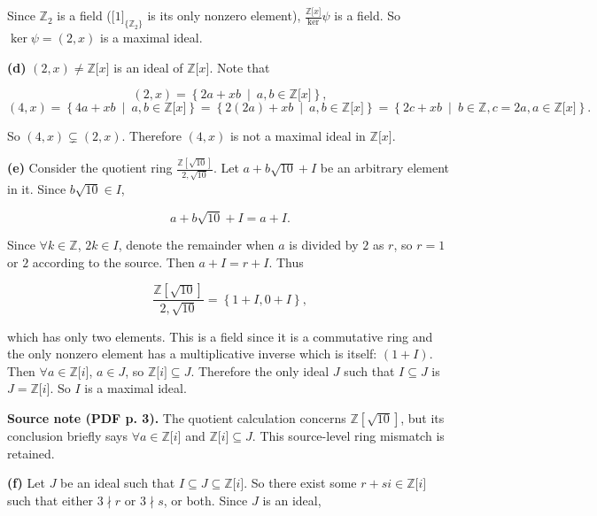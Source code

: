 Since \(\mathbb{Z}_{2}\) is a field (\(\lbrack 1\rbrack_{\{\mathbb{Z}_{2}\}}\) is its only nonzero element), \(\frac{\mathbb{Z}\lbrack x\rbrack}{\ker}\psi\) is a field. So \(\ker\psi = \left( {2,x} \right)\) is a maximal ideal.

\textbf{(d)} \(\left( {2,x} \right) \neq \mathbb{Z}\lbrack x\rbrack\) is an ideal of \(\mathbb{Z}\lbrack x\rbrack\). Note that

\[\left( {2,x} \right) = \left\{ 2a + xb\  \middle| \ a,b \in \mathbb{Z}\lbrack x\rbrack \right\},\]\[\left( {4,x} \right) = \left\{ 4a + xb\  \middle| \ a,b \in \mathbb{Z}\lbrack x\rbrack \right\} = \left\{ 2\left( {2a} \right) + xb\  \middle| \ a,b \in \mathbb{Z}\lbrack x\rbrack \right\} = \left\{ 2c + xb\  \middle| \ b \in \mathbb{Z},c = 2a,a \in \mathbb{Z}\lbrack x\rbrack \right\}.\]

So \(\left( {4,x} \right) \subsetneq \left( {2,x} \right)\). Therefore \(\left( {4,x} \right)\) is not a maximal ideal in \(\mathbb{Z}\lbrack x\rbrack\).

\textbf{(e)} Consider the quotient ring \(\frac{\mathbb{Z}\left\lbrack \sqrt{10} \right\rbrack}{2,\sqrt{10}}\). Let \(a + b\sqrt{10} + I\) be an arbitrary element in it. Since \(b\sqrt{10} \in I\),

\[a + b\sqrt{10} + I = a + I.\]

Since \(\forall k \in \mathbb{Z}\), \(2k \in I\), denote the remainder when \(a\) is divided by \(2\) as \(r\), so \(r = 1\) or \(2\) according to the source. Then \(a + I = r + I\). Thus

\[\frac{\mathbb{Z}\left\lbrack \sqrt{10} \right\rbrack}{2,\sqrt{10}} = \left\{ {1 + I,0 + I} \right\},\]

which has only two elements. This is a field since it is a commutative ring and the only nonzero element has a multiplicative inverse which is itself: \(\left( {1 + I} \right)\). Then \(\forall a \in \mathbb{Z}\lbrack i\rbrack\), \(a \in J\), so \(\mathbb{Z}\lbrack i\rbrack \subseteq J\). Therefore the only ideal \(J\) such that \(I \subseteq J\) is \(J = \mathbb{Z}\lbrack i\rbrack\). So \(I\) is a maximal ideal.

{\textbf{Source note (PDF p. 3).} The quotient calculation concerns \(\mathbb{Z}\left\lbrack \sqrt{10} \right\rbrack\), but its conclusion briefly says \(\forall a \in \mathbb{Z}\lbrack i\rbrack\) and \(\mathbb{Z}\lbrack i\rbrack \subseteq J\). This source-level ring mismatch is retained.}

\textbf{(f)} Let \(J\) be an ideal such that \(I \subseteq J \subseteq \mathbb{Z}\lbrack i\rbrack\). So there exist some \(r + si \in \mathbb{Z}\lbrack i\rbrack\) such that either \(3 \nmid r\) or \(3 \nmid s\), or both. Since \(J\) is an ideal,

